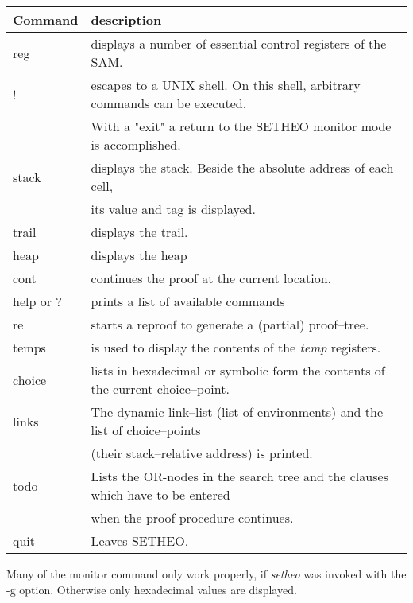 \begin{tabular}{|l|l|}
\hline
Command & description \\
\hline
\hline
reg  &
displays a number of essential control registers of the SAM.\\
\hline
!  &
escapes to a UNIX shell. On this shell, arbitrary commands can be executed. \\
& With a "exit" a return to the SETHEO monitor mode is accomplished.\\
\hline
stack  &
displays the stack. Beside the absolute address of each cell, \\
&  its value and tag is displayed.\\
\hline
trail  &
displays the trail.\\
\hline
heap  &
displays the heap\\
\hline
cont  &
continues the proof at the current location.\\
\hline
help or ?  &
prints a list of available commands\\
\hline
re  &
starts a reproof to generate a (partial) proof--tree.\\
\hline
temps  &
is used to display the contents of the {\it temp\/} registers.\\
\hline
choice  &
lists in hexadecimal or symbolic form the contents of the current
choice--point.\\
\hline
links  &
The dynamic link--list (list of environments) and the list of choice--points \\
 & (their stack--relative address) is printed.\\
\hline
todo  &
Lists the OR-nodes in the search tree and the clauses which have to be
entered \\
&  when the proof procedure continues.\\
\hline
quit  &
Leaves SETHEO.\\
\hline
\end{tabular}
\vspace{8mm}

Many of the monitor command only work properly, if {\it setheo\/} was
invoked with the -g option. Otherwise only hexadecimal values are displayed.

